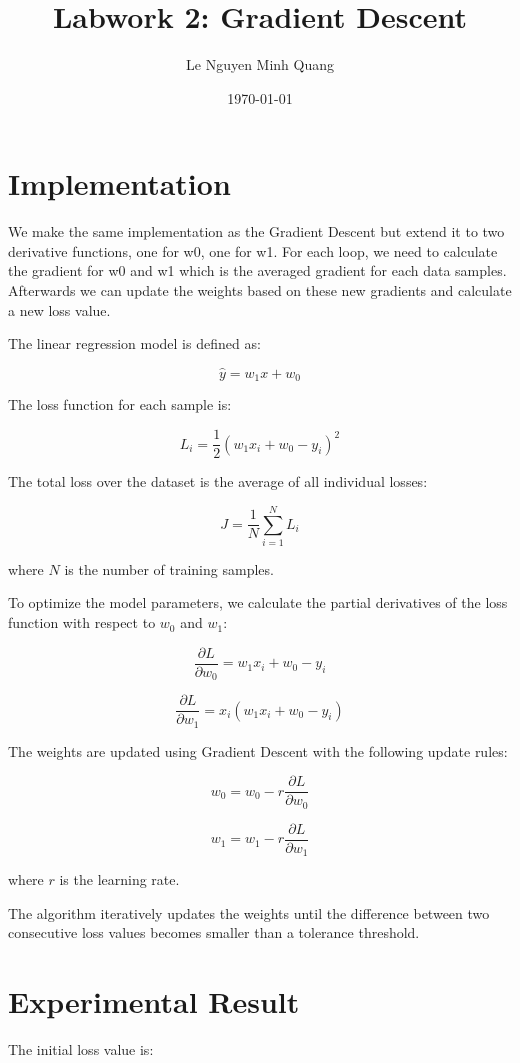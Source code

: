 \documentclass{article}
\title{Labwork 2: Gradient Descent}
\author{Le Nguyen Minh Quang}
\date{\today}
\begin{document}
\maketitle

\section{Implementation}

We make the same implementation as the Gradient Descent but extend it to two derivative functions, one for w0, one for w1. For each loop, we need to calculate the gradient for w0 and w1 which is the averaged gradient for each data samples. Afterwards we can update the weights based on these new gradients and calculate a new loss value.

The linear regression model is defined as:

\[
\hat{y} = w_1x + w_0
\]

The loss function for each sample is:

\[
L_i = \frac{1}{2}(w_1x_i + w_0 - y_i)^2
\]

The total loss over the dataset is the average of all individual losses:

\[
J = \frac{1}{N}\sum_{i=1}^{N}L_i
\]

where \(N\) is the number of training samples.

To optimize the model parameters, we calculate the partial derivatives of the loss function with respect to \(w_0\) and \(w_1\):

\[
\frac{\partial L}{\partial w_0} = w_1x_i + w_0 - y_i
\]

\[
\frac{\partial L}{\partial w_1} = x_i(w_1x_i + w_0 - y_i)
\]

The weights are updated using Gradient Descent with the following update rules:

\[
w_0 = w_0 - r \frac{\partial L}{\partial w_0}
\]

\[
w_1 = w_1 - r \frac{\partial L}{\partial w_1}
\]

where \(r\) is the learning rate.

The algorithm iteratively updates the weights until the difference between two consecutive loss values becomes smaller than a tolerance threshold.

\section{Experimental Result}

The initial loss value is:
\end{document}
